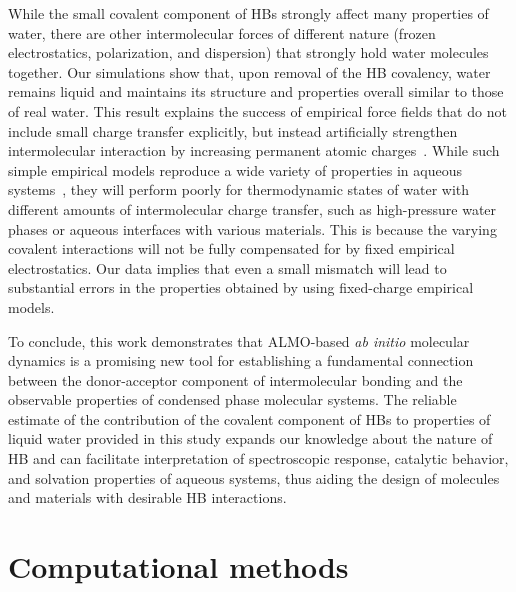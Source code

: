 \documentclass[journal=jacsat,manuscript=article]{achemso}
\begin{document}
While the small covalent component of HBs strongly affect many properties of water, there are other intermolecular forces of different nature (frozen electrostatics, polarization, and dispersion) that strongly hold water molecules together. 
Our simulations show that, upon removal of the HB covalency, water remains liquid and maintains its structure and properties overall similar to those of real water. 
This result explains the success of empirical force fields that do not include small charge transfer explicitly, but instead artificially strengthen intermolecular interaction by increasing permanent atomic charges~\cite{rick2016polarizable}. 
While such simple empirical models reproduce a wide variety of properties in aqueous systems~\cite{vega2011simulating}, they will perform poorly for thermodynamic states of water with different amounts of intermolecular charge transfer, such as high-pressure water phases or aqueous interfaces with various materials. 
This is because the varying covalent interactions will not be fully compensated for by fixed empirical electrostatics.
Our data implies that even a small mismatch will lead to substantial errors in the properties obtained by using fixed-charge empirical models.

To conclude, this work demonstrates that ALMO-based \emph{ab initio} molecular dynamics is a promising new tool for establishing a fundamental connection between the donor-acceptor component of intermolecular bonding and the observable properties of condensed phase molecular systems. 
The reliable estimate of the contribution of the covalent component of HBs to properties of liquid water provided in this study expands our knowledge about the nature of HB and can facilitate interpretation of spectroscopic response, catalytic behavior, and solvation properties of aqueous systems, thus aiding the design of molecules and materials with desirable HB interactions. 
 
\section{Computational methods}
\end{document}
